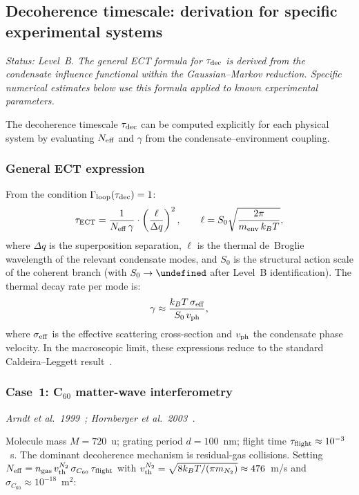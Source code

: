 \documentclass[11pt,a4paper]{article}
\let\hbar\undefined
\numberwithin{equation}{section}
\begin{document}
\subsection{Decoherence timescale: derivation for specific experimental systems}
\label{sec:tau_ECT_systems}

\textit{Status: Level~B. The general ECT formula for $\tau_{\rm dec}$ is
derived from the condensate influence functional within the Gaussian--Markov
reduction. Specific numerical estimates below use this formula applied to
known experimental parameters.}

The decoherence timescale $\tau_{\rm dec}$ can be computed explicitly
for each physical system by evaluating $N_{\rm eff}$ and $\gamma$ from the
condensate--environment coupling.

\subsubsection*{General ECT expression}

From the condition $\Gamma_{\rm loop}(\tau_{\rm dec})=1$:
\begin{equation}
  \label{eq:tau_ECT_general}
  \tau_{\rm ECT}
  = \frac{1}{N_{\rm eff}\,\gamma}
    \cdot\left(\frac{\ell}{\Delta q}\right)^2,
  \qquad
  \ell = S_0\sqrt{\frac{2\pi}{m_{\rm env}\,k_B T}},
\end{equation}
where $\Delta q$ is the superposition separation, $\ell$ is the
thermal de~Broglie wavelength of the relevant condensate modes,
and $S_0$ is the structural action scale of the coherent branch
(with $S_0 \to \hbar$ after Level~B identification).
The thermal decay rate per mode is:
\begin{equation}
  \label{eq:gamma_thermal_ECT}
  \gamma \approx \frac{k_B T\,\sigma_{\rm eff}}{S_0\,v_{\rm ph}},
\end{equation}
where $\sigma_{\rm eff}$ is the effective scattering cross-section
and $v_{\rm ph}$ the condensate phase velocity.  In the macroscopic
limit, these expressions reduce to the standard Caldeira--Leggett
result~\cite{CaldeiraLeggett1983}.

\subsubsection*{Case~1: C$_{60}$ matter-wave interferometry}

\textit{Arndt et al.\ 1999~\cite{Arndt1999}; Hornberger et al.\ 2003~\cite{Hornberger2003}.}

Molecule mass $M = 720$~u; grating period $d = 100$~nm; flight time
$\tau_{\rm flight}\approx10^{-3}$~s.
The dominant decoherence mechanism is residual-gas collisions.
Setting $N_{\rm eff} = n_{\rm gas}\,v_{\rm th}^{N_2}\,\sigma_{C_{60}}\,\tau_{\rm flight}$
with $v_{\rm th}^{N_2} = \sqrt{8k_BT/(\pi m_{N_2})} \approx 476$~m/s
and $\sigma_{C_{60}}\approx 10^{-18}$~m$^2$:
\end{document}
